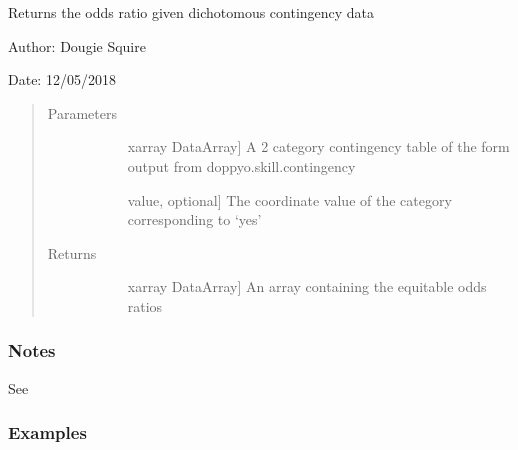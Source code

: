 \documentclass[letterpaper,10pt,english]{sphinxmanual}
\begin{document}

\begin{fulllineitems}
\label{\detokenize{skill_doc:skill.odds_ratio}}
Returns the odds ratio given dichotomous contingency data

\begin{DUlineblock}{0em}
\item[] Author: Dougie Squire
\item[] Date: 12/05/2018
\end{DUlineblock}
\begin{quote}\begin{description}
\item[{Parameters}] \leavevmode\begin{description}
\item[{}] \leavevmode{[}xarray DataArray{]}
A 2 category contingency table of the form output from doppyo.skill.contingency

\item[{}] \leavevmode{[}value, optional{]}
The coordinate value of the category corresponding to ‘yes’

\end{description}

\item[{Returns}] \leavevmode\begin{description}
\item[{}] \leavevmode{[}xarray DataArray{]}
An array containing the equitable odds ratios

\end{description}

\end{description}\end{quote}
\subsubsection*{Notes}

See 
\subsubsection*{Examples}


\end{fulllineitems}
\end{document}
